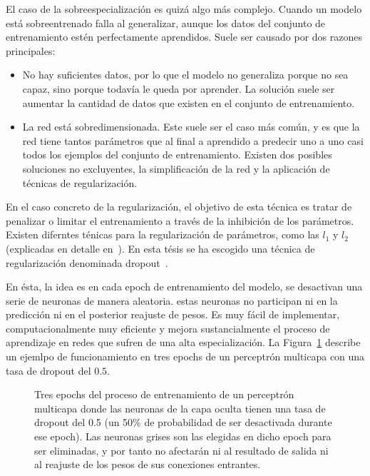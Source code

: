 El caso de la sobreespecialización es quizá algo más complejo. Cuando un modelo está sobreentrenado falla al generalizar, aunque los datos del conjunto de entrenamiento estén perfectamente aprendidos. Suele ser causado por dos razones principales:

\begin{itemize}
	\item No hay suficientes datos, por lo que el modelo no generaliza porque no sea capaz, sino porque todavía le queda por aprender. La solución suele ser aumentar la cantidad de datos que existen en el conjunto de entrenamiento.
	\item La red está sobredimensionada. Este suele ser el caso más común, y es que la red tiene tantos parámetros que al final a aprendido a predecir uno a uno casi todos los ejemplos del conjunto de entrenamiento. Existen dos posibles soluciones no excluyentes, la simplificación de la red y la aplicación de técnicas de regularización.
\end{itemize}

En el caso concreto de la regularización, el objetivo de esta técnica es tratar de penalizar o limitar el entrenamiento a través de la inhibición de los parámetros. Existen diferntes ténicas para la regularización de parámetros, como las $l_1$ y $l_2$ (explicadas en detalle en~\cite{ng2004feature}). En esta tésis se ha escogido una técnica de regularización denominada dropout~\cite{srivastava2014dropout}.

En ésta, la idea es en cada epoch de entrenamiento del modelo, se desactivan una serie de neuronas de manera aleatoria. estas neuronas no participan ni en la predicción ni en el posterior reajuste de pesos. Es muy fácil de implementar, computacionalmente muy eficiente y mejora sustancialmente el proceso de aprendizaje en redes que sufren de una alta especialización. La Figura~\ref{fig:dropout-example} describe un ejemlpo de funcionamiento en tres epochs de un perceptrón multicapa con una tasa de dropout del $0.5$.

\begin{figure}[t]
	\centering
	\qquad
	\qquad
	\caption{Tres epochs del proceso de entrenamiento de un perceptrón multicapa donde las neuronas de la capa oculta tienen una tasa de dropout del 0.5 (un 50\% de probabilidad de ser desactivada durante ese epoch). Las neuronas grises son las elegidas en dicho epoch para ser eliminadas, y por tanto no afectarán ni al resultado de salida ni al reajuste de los pesos de sus conexiones entrantes.}
	\label{fig:dropout-example}
\end{figure}

